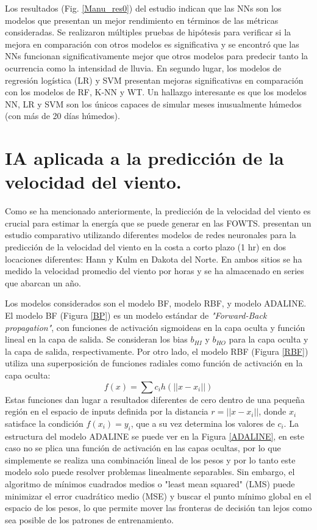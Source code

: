 \documentclass[12pt]{article}
\begin{document}
Los resultados (Fig. \ref{Manu_res0}) del estudio indican que las NNs son los modelos que presentan un mejor rendimiento en términos de las métricas consideradas. Se realizaron múltiples pruebas de hipótesis para verificar si la mejora en comparación con otros modelos es significativa y se encontró que las NNs funcionan significativamente mejor que otros modelos para predecir tanto la ocurrencia como la intensidad de lluvia. En segundo lugar, los modelos de regresión logística (LR) y SVM presentan mejoras significativas en comparación con los modelos de RF, K-NN y WT. Un hallazgo interesante es que los modelos NN, LR y SVM son los únicos capaces de simular meses inusualmente húmedos (con más de 20 días húmedos).


\section{IA aplicada a la predicción de la velocidad del viento.}

Como se ha mencionado anteriormente, la predicción de la velocidad del viento es crucial para estimar la energía que se puede generar en las FOWTS.
\citet{Li2} presentan un estudio comparativo utilizando diferentes modelos de redes neuronales para la predicción de la velocidad del viento en la costa 
a corto plazo (1 hr) en dos locaciones diferentes:  Hann y Kulm en Dakota del Norte. En ambos sitios se ha medido la velocidad promedio del viento por horas y se ha almacenado en series que abarcan un año. 

Los modelos considerados son el modelo BF, modelo RBF, y modelo ADALINE. El modelo BF (Figura \ref{BP}) es un modelo estándar de \textit{"Forward-Back propagation"}, con funciones de activación sigmoideas en la capa oculta y función lineal en la capa de salida. Se consideran los bias $b_{HI}$ y $b_{HO}$ para la capa oculta y la capa de salida, respectivamente. Por otro lado, el modelo RBF (Figura \ref{RBF}) utiliza una superposición de funciones radiales como función de activación en la capa oculta:
\begin{equation}
f(x)=\sum c_i h(||x-x_i||)
\end{equation}
Estas funciones dan lugar a resultados diferentes de cero dentro de una pequeña región en el espacio de inputs definida por la distancia $r=||x-x_i||$, donde $x_i$ satisface la condición $f(x_i)=y_i$, que a su vez determina los valores de $c_i$. 
La estructura del modelo ADALINE se puede ver en la Figura \ref{ADALINE}, en este caso no se plica una función de activación en las capas ocultas, por lo que simplemente se realiza una combinación lineal de los pesos y por lo tanto este modelo solo puede resolver problemas linealmente separables. Sin embargo, el algoritmo de mínimos cuadrados medios o "least mean squared" (LMS) puede minimizar el error cuadrático medio (MSE) y buscar el punto mínimo global en el espacio de los pesos, lo que permite mover las fronteras de decisión tan lejos como sea posible de los patrones de entrenamiento.
\end{document}
